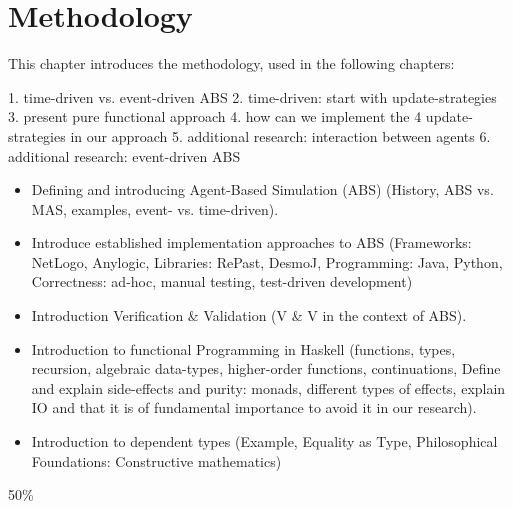 \chapter{Methodology}
This chapter introduces the methodology, used in the following chapters:

1. time-driven vs. event-driven ABS
2. time-driven: start with update-strategies
3. present pure functional approach
4. how can we implement the 4 update-strategies in our approach
5. additional research: interaction between agents
6. additional research: event-driven ABS

\begin{itemize}
	\item Defining and introducing Agent-Based Simulation (ABS) (History, ABS vs. MAS, examples, event- vs. time-driven).
	\item Introduce established implementation approaches to ABS (Frameworks: NetLogo, Anylogic, Libraries: RePast, DesmoJ, Programming: Java, Python, Correctness: ad-hoc, manual testing, test-driven development)
	\item Introduction Verification \& Validation (V \& V in the context of ABS).
	\item Introduction to functional Programming in Haskell (functions, types, recursion, algebraic data-types, higher-order functions, continuations, Define and explain side-effects and purity: monads, different types of effects, explain IO and that it is of fundamental importance to avoid it in our research).
	\item Introduction to dependent types (Example, Equality as Type, Philosophical Foundations: Constructive mathematics)
\end{itemize}
50\%

